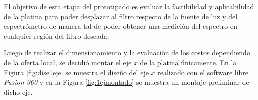 El objetivo de esta etapa del prototipado es evaluar la factibilidad y aplicabilidad de la platina para poder desplazar al filtro respecto de la fuente de luz y del espectrómetro de manera tal de poder obtener una medición del espectro en cualquier región del filtro deseada. 

Luego de realizar el dimensionamiento y la evaluación de los costos dependiendo de la oferta local, se decidió montar el eje $\textit{x}$ de la platina únicamente. En la Figura \ref{fig:dise1eje} se muestra el diseño del eje $\textit{x}$ realizado con el software libre \textit{Fusion 360} y en la Figura \ref{fig:1ejmontado} se muestra un montaje preliminar de dicho eje. 

\begin{figure}[H]
	\begin{floatrow}

\end{floatrow}
\end{figure}
